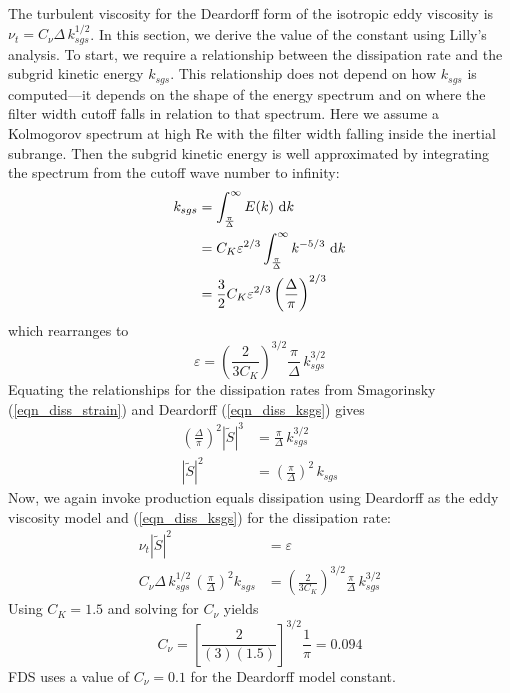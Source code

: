 The turbulent viscosity for the Deardorff form of the isotropic eddy viscosity is $\nu_t = C_\nu \Delta \, k_{sgs}^{1/2}$.  In this section, we derive the value of the constant using Lilly's analysis.  To start, we require a relationship between the dissipation rate and the subgrid kinetic energy $k_{sgs}$.  This relationship does not depend on how $k_{sgs}$ is computed---it depends on the shape of the energy spectrum and on where the filter width cutoff falls in relation to that spectrum.  Here we assume a Kolmogorov spectrum at high Re with the filter width falling inside the inertial subrange.  Then the subgrid kinetic energy is well approximated by integrating the spectrum from the cutoff wave number to infinity:
\begin{align}
k_{sgs} &= \int_{\frac{\pi}{\Delta}}^\infty E(k) \,\,\mathrm{d} k \\
&= C_K \varepsilon^{2/3} \int_{\frac{\pi}{\Delta}}^\infty k^{-5/3} \,\,\mathrm{d} k \\
&= \frac{3}{2} C_K \varepsilon^{2/3} \left(\frac{\Delta}{\pi}\right)^{2/3}
\end{align}
which rearranges to
\begin{equation}
\label{eqn_diss_ksgs}
\varepsilon = \left(\frac{2}{3 C_K}\right)^{3/2} \frac{\pi}{\Delta} \,k_{sgs}^{3/2}
\end{equation}
Equating the relationships for the dissipation rates from Smagorinsky (\ref{eqn_diss_strain}) and Deardorff (\ref{eqn_diss_ksgs}) gives
\begin{align}
\left(\frac{\Delta}{\pi}\right)^2 |\tilde{S}|^3 &= \frac{\pi}{\Delta} \,k_{sgs}^{3/2} \\
|\tilde{S}|^2 &= \left( \frac{\pi}{\Delta} \right)^2 \,k_{sgs}
\end{align}
Now, we again invoke production equals dissipation using Deardorff as the eddy viscosity model and (\ref{eqn_diss_ksgs}) for the dissipation rate:
\begin{align}
\nu_t |\tilde{S}|^2 &= \varepsilon \\
C_\nu \Delta \,k_{sgs}^{1/2} \, \left(\frac{\pi}{\Delta}\right)^2 k_{sgs} &= \left(\frac{2}{3 C_K}\right)^{3/2} \frac{\pi}{\Delta} \,k_{sgs}^{3/2}
\end{align}
Using $C_K = 1.5$ and solving for $C_\nu$ yields
\begin{equation}
C_\nu = \left[\frac{2}{(3)(1.5)}\right]^{3/2} \frac{1}{\pi} = 0.094
\end{equation}
FDS uses a value of $C_\nu = 0.1$ for the Deardorff model constant.



